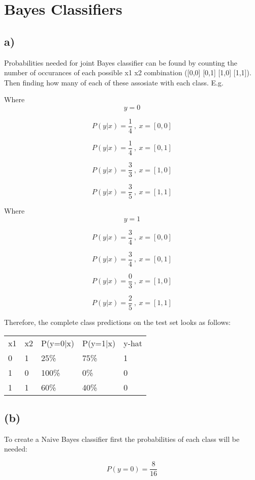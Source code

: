 \documentclass{article}
\begin{document}
\section{Bayes Classifiers}

\subsection{a)}

Probabilities needed for joint Bayes classifier can be found by counting the number of occurances of each possible x1 x2 combination ([0,0] [0,1] [1,0] [1,1]). Then finding how many of each of these assosiate with each class. E.g.

Where $$ y=0 $$

$$ P(y|x) = \frac{1}{4}\ ,\ x = [0,0] $$

$$ P(y|x) = \frac{1}{4}\ ,\ x = [0,1] $$

$$ P(y|x) = \frac{3}{3}\ ,\ x = [1,0] $$

$$ P(y|x) = \frac{3}{5}\ ,\ x = [1,1] $$

Where $$ y=1 $$

$$ P(y|x) = \frac{3}{4}\ ,\ x = [0,0] $$

$$ P(y|x) = \frac{3}{4}\ ,\ x = [0,1] $$

$$ P(y|x) = \frac{0}{3}\ ,\ x = [1,0] $$

$$ P(y|x) = \frac{2}{5}\ ,\ x = [1,1] $$

Therefore, the complete class predictions on the test set looks as follows:

\begin{table}[h]
\begin{tabular}{lllll}
 x1  &  x2  &  P(y=0|x)  &  P(y=1|x)  &  y-hat \\
   0  &   1  &     25\%    &     75\%    &    1 \\
   1  &   0  &    100\%    &      0\%    &    0 \\
   1  &   1  &     60\%    &     40\%    &    0  
\end{tabular}
\end{table}

\subsection{(b)}

To create a Naive Bayes classifier first the probabilities of each class will be needed:

$$ P(y=0) = \frac{8}{16} $$
\end{document}
